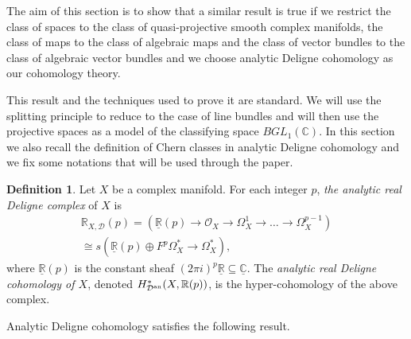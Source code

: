 \documentclass[10pt,twoside]{article}
\numberwithin{equation}{section}
\theoremstyle{plain}
\theoremstyle{definition}
\newtheorem{definition}[equation]{Definition}
\newcommand{\an}{\text{{\rm an}}}
\begin{document}
The aim of this section is to show that a similar result is true if we
restrict the class of spaces to the class of quasi-projective smooth
complex manifolds, the class of maps to the class of algebraic maps
and the class of vector bundles to the class of algebraic vector
bundles and we choose analytic Deligne
cohomology as our cohomology theory.  

This result and the techniques used to prove it are standard. We will
use the splitting principle to reduce to 
the case of line bundles and will then use the projective spaces as
a model of the 
classifying space $BGL_{1}(\mathbb{C})$. In this section we also
recall the definition of Chern classes in analytic Deligne cohomology
and 
we fix some notations that will be used through the
paper. 
 

\begin{definition}
  Let $X$ be a complex manifold. For each integer $p$, \emph{the
    analytic real Deligne  complex} of $X$ is
  \begin{multline*}
    \mathbb{R}_{X,\mathcal{D}}(p)= (\underline
    {\mathbb{R}}(p)\longrightarrow 
    \mathcal{O}_{X}\longrightarrow \Omega ^{1}_{X}\longrightarrow \dots 
    \longrightarrow \Omega ^{p-1}_{X})\\
    \cong s(\underline
    {\mathbb{R}}(p)\oplus F^{p}\Omega _{X}^{\ast}\longrightarrow \Omega
    ^{\ast}_{X}), 
  \end{multline*}
  where $\underline
    {\mathbb{R}}(p)$ is the constant sheaf $(2\pi i)^{p}\underline
    {\mathbb{R}}\subseteq \underline {\mathbb{C}}$.
  The \emph{analytic real Deligne cohomology  of $X$}, denoted
  $H^{\ast}_{\mathcal{D}^{\an}}(X,\mathbb{R}(p))$, is the 
  hyper-cohomology of the above complex. 
\end{definition}

Analytic Deligne cohomology satisfies the following result.
\end{document}

